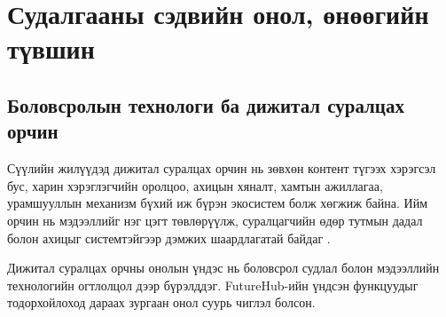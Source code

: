 \chapter{Судалгааны сэдвийн онол, өнөөгийн түвшин}
\label{ch:literature}



\section{Боловсролын технологи ба дижитал суралцах орчин}

Сүүлийн жилүүдэд дижитал суралцах орчин нь зөвхөн контент түгээх хэрэгсэл бус, харин хэрэглэгчийн оролцоо, ахицын хяналт, хамтын ажиллагаа, урамшууллын механизм бүхий иж бүрэн экосистем болж хөгжиж байна. Ийм орчин нь мэдээллийг нэг цэгт төвлөрүүлж, суралцагчийн өдөр тутмын дадал болон ахицыг системтэйгээр дэмжих шаардлагатай байдаг \cite{Siemens2005}.

Дижитал суралцах орчны онолын үндэс нь боловсрол судлал болон мэдээллийн технологийн огтлолцол дээр бүрэлддэг. FutureHub-ийн үндсэн функцуудыг тодорхойлоход дараах зургаан онол суурь чиглэл болсон.

